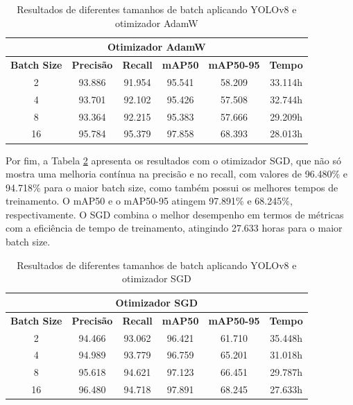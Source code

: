 \begin{table}[!hbt]
    \centering
    \begin{tabular}{|c|c|c|c|c|c|}
    \hline
    \multicolumn{6}{|c|}{\textbf{Otimizador AdamW}} \\ \hline
    \textbf{Batch Size} & \textbf{Precisão} & \textbf{Recall} & \textbf{mAP50} & \textbf{mAP50-95} & \textbf{Tempo} \\ \hline
    2                   & 93.886            & 91.954          & 95.541         & 58.209            & 33.114h        \\ \hline
    4                   & 93.701            & 92.102          & 95.426         & 57.508            & 32.744h        \\ \hline
    8                   & 93.364            & 92.215          & 95.383         & 57.666            & 29.209h        \\ \hline
    16                  & 95.784            & 95.379          & 97.858         & 68.393            & 28.013h        \\ \hline
    \end{tabular}
    \caption{Resultados de diferentes tamanhos de batch aplicando YOLOv8 e otimizador AdamW}
    \label{tab:yolov8-admw}
\end{table}

Por fim, a Tabela \ref{tab:yolov8-sgd} apresenta os resultados com o otimizador SGD, que não só mostra uma melhoria contínua na precisão e no recall, com valores de 96.480\% e 94.718\% para o maior batch size, como também possui os melhores tempos de treinamento. O mAP50 e o mAP50-95 atingem 97.891\% e 68.245\%, respectivamente. O SGD combina o melhor desempenho em termos de métricas com a eficiência de tempo de treinamento, atingindo 27.633 horas para o maior batch size.

\begin{table}[!hbt]
    \centering
    \begin{tabular}{|c|c|c|c|c|c|}
    \hline
    \multicolumn{6}{|c|}{\textbf{Otimizador SGD}} \\ \hline
    \textbf{Batch Size} & \textbf{Precisão} & \textbf{Recall} & \textbf{mAP50} & \textbf{mAP50-95} & \textbf{Tempo} \\ \hline
    2                   & 94.466            & 93.062          & 96.421         & 61.710            & 35.448h        \\ \hline
    4                   & 94.989            & 93.779          & 96.759         & 65.201            & 31.018h        \\ \hline
    8                   & 95.618            & 94.621          & 97.123         & 66.451            & 29.787h        \\ \hline
    16                  & 96.480            & 94.718          & 97.891         & 68.245            & 27.633h        \\ \hline
    \end{tabular}
    \caption{Resultados de diferentes tamanhos de batch aplicando YOLOv8 e otimizador SGD}
    \label{tab:yolov8-sgd}
\end{table}

